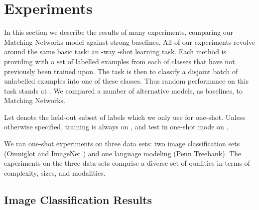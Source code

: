 \section{Experiments}
\label{sec:results}

In this section we describe the results of many experiments, comparing our Matching Networks model against strong baselines.
All of our experiments revolve around the same basic task: an -way -shot learning task.
Each method is providing with a set of  labelled examples from each of  classes that have not previously been trained upon.
The task is then to classify a disjoint batch of unlabelled examples into one of these  classes.
Thus random performance on this task stands at .
We compared a number of alternative models, as baselines, to Matching Networks.

Let  denote the held-out subset of labels which we only use for one-shot. Unless otherwise specified, training is always on , and test in one-shot mode on .

We ran one-shot experiments on three data sets: two image classification sets (Omniglot \cite{omniglot} and ImageNet \cite[ILSVRC-2012]{ImageNet}) and one language modeling (Penn Treebank).
The experiments on the three data sets comprise a diverse set of qualities in terms of complexity, sizes, and modalities. 

\subsection{Image Classification Results}

